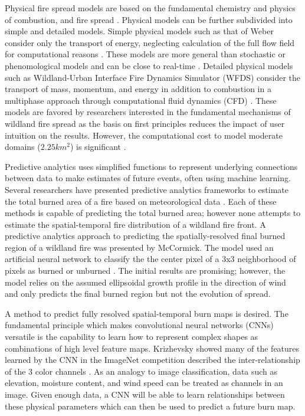 \documentclass[smallcondensed]{svjour3}     %
\begin{document}
Physical fire spread models are based on the fundamental chemistry and physics of
combustion, and fire spread \cite{sullivan2007a}. Physical models can be further 
subdivided into simple and detailed models. Simple physical models such as that of
Weber consider only the transport of energy, neglecting calculation of the full
flow field for computational reasons \cite{weber1991modelling}. These models
are more general than stochastic or phenomological models and can be close to
real-time \cite{simeoni2015wildland}. Detailed physical models such as
Wildland-Urban Interface Fire Dynamics Simulator (WFDS) consider the transport of
mass, momentum, and energy in addition to combustion in a multiphase approach
through computational fluid dynamics (CFD) \cite{mell2007physics}. These models
are favored by researchers interested in the fundamental mechanisms of wildland
fire spread as the basis on first principles reduces the impact of user intuition
on the results. However, the computational cost to model moderate domains
($2.25km^{2}$) is significant \cite{mell2007physics}.

Predictive analytics uses simplified functions to represent underlying connections
between data to make estimates of future events, often using machine learning.
Several researchers have presented predictive analytics frameworks to estimate the
total burned area of a fire based on meteorological data 
\cite{safi2013prediction,castelli2015predicting,storer2016pso,naganathan2016wildfire,cao2017wildfire}.
Each of these methods is capable of predicting the total burned area; however none
attempts to estimate the spatial-temporal fire distribution of a wildland fire front.
A predictive analytics approach to predicting the spatially-resolved final burned
region of a wildland fire was presented by McCormick.
The model used an artificial neural network to classify
the the center pixel of a 3x3 neighborhood of pixels as burned or unburned
\cite{mccormick2001toward,mccormick2002developing}.
The initial results are promising; however, the model relies on the assumed
ellipsoidal growth profile in the direction of wind
\cite{finney1999mechanistic} and only predicts the final burned region but 
not the evolution of spread.

A method to predict fully resolved spatial-temporal burn maps is desired.
The fundamental principle which makes convolutional neural networks (CNNs)
versatile is the capability to learn how to represent complex
shapes as combinations of high level feature maps. Krizhevsky showed
many of the features learned by the CNN in the ImageNet competition
described the inter-relationship of the 3 color channels \cite{krizhevsky2012imagenet}.
As an analogy to image classification, data such as elevation, moisture content, and 
wind speed can be treated as channels in an image. Given enough data, a CNN will be
able to learn relationships between these physical parameters which can then be used
to predict a future burn map. 
\end{document}
